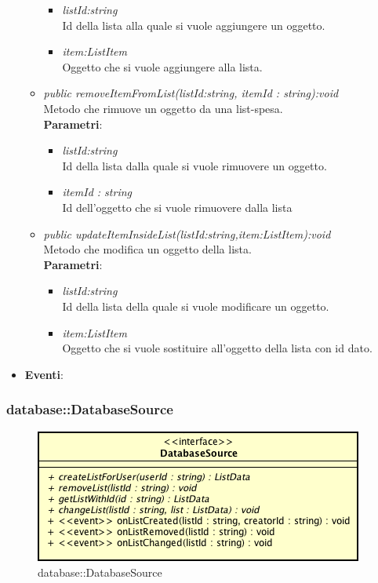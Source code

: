 \begin{itemize}
\begin{itemize}
\begin{itemize}
			\item \textit{listId:string}\\
			Id della lista alla quale si vuole aggiungere un oggetto.
			\item \textit{item:ListItem}\\
			Oggetto che si vuole aggiungere alla lista.
			\end{itemize} 
	\item \textit{public removeItemFromList(listId:string, itemId : string):void}\\
	Metodo che rimuove un oggetto da una list-spesa.
			\\ \textbf{Parametri}: \begin{itemize}
			\item \textit{listId:string}\\
			Id della lista dalla quale si vuole rimuovere un oggetto.
			\item \textit{itemId : string} \\
			Id dell'oggetto che si vuole rimuovere dalla lista
			\end{itemize} 
	\item \textit{public updateItemInsideList(listId:string,item:ListItem):void}\\
	Metodo che modifica un oggetto della lista.
			\\ \textbf{Parametri}: \begin{itemize}
			\item \textit{listId:string}\\
			Id della lista della quale si vuole modificare un oggetto.
			\item \textit{item:ListItem}\\
			Oggetto che si vuole sostituire all'oggetto della lista con id dato.
			\end{itemize} 
	\end{itemize}
\item \textbf{Eventi}:
\end{itemize}

\subsubsection{database::DatabaseSource}

\label{database::DatabaseSource}
\begin{figure}[ht]
	\centering
	\includegraphics[scale=0.5]{Sezioni/SottosezioniST/img/app/DatabaseSource.png}
	\caption{database::DatabaseSource}
\end{figure}

